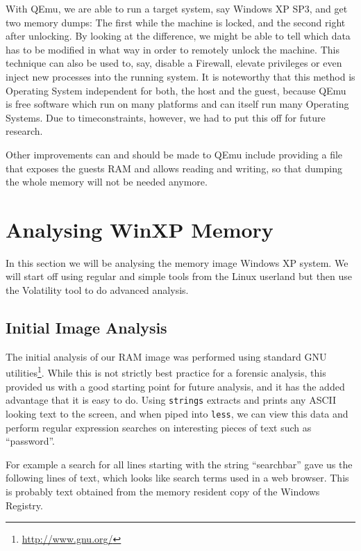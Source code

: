 \documentclass[a4paper,
    11pt,
    normalheadings,
    parindent,
    UKenglish,
    abstracton,
    ]{scrartcl}
\begin{document}
With QEmu, we are able to run a target system, say Windows XP SP3, and get two memory dumps:
The first while the machine is locked, and the second right after unlocking.
By looking at the difference, we might be able to tell which data has to be modified in what way in order to remotely unlock the machine.
This technique can also be used to, say, disable a Firewall, elevate privileges or even inject new processes into the running system.
It is noteworthy that this method is Operating System independent for both, the host and the guest, because QEmu is free software which run on many platforms and can itself run many Operating Systems.
Due to timeconstraints, however, we had to put this off for future research.

Other improvements can and should be made to QEmu include providing a file that exposes the guests RAM and allows reading and writing, so that dumping the whole memory will not be needed anymore.







\section{Analysing WinXP Memory}
In this section we will be analysing the memory image Windows XP system.
We will start off using regular and simple tools from the Linux userland but then use the Volatility tool to do advanced analysis.


\subsection{Initial Image Analysis}
The initial analysis of our RAM image was performed using standard GNU utilities\footnote{\url{http://www.gnu.org/}}.
While this is not strictly best practice for a forensic analysis, this provided us with a good starting point for future analysis, and it has the added advantage that it is easy to do.
Using \texttt{strings} extracts and prints any ASCII looking text to the screen, and when piped into \texttt{less}, we can view this data and perform regular expression searches on interesting pieces of text such as ``password''.

For example a search for all lines starting with the string ``searchbar'' gave us the following lines of text, which looks like search terms used in a web browser.
This is probably text obtained from the memory resident copy of the Windows Registry.
\end{document}
